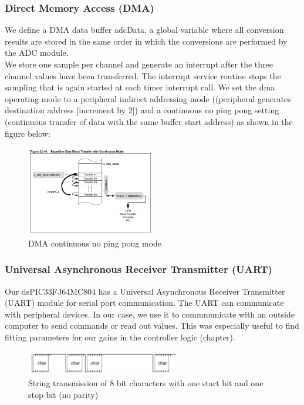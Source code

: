 \subsubsection*{Direct Memory Access (DMA)}

We define a DMA data buffer adcData, a global variable where all conversion results are stored in the same order in which the conversions are performed by the ADC module.\\
We store one sample per channel and generate an interrupt after the three channel values have been transferred. The interrupt service routine stops the sampling that is again started at each timer interrupt call.
\vskip 0.1in
\noindent
We set the dma operating mode to a peripheral indirect addressing mode ((peripheral generates destination address [increment by 2]) and a continuous no ping pong setting (continuous transfer of data with the same buffer start address) as shown in the figure below:

\begin{figure}[H]
    \centering
    \includegraphics[width=0.5\textwidth]{figures/software/DMA.png}
    \caption{DMA continuous no ping pong mode}
    \label{fig:dma}
\end{figure}

\subsubsection*{Universal Asynchronous Receiver Transmitter (UART)}
Our dsPIC33FJ64MC804 has a Universal Asynchronous Receiver Transmitter (UART)  module for serial port communication.
The UART can communicate with peripheral devices.
In our case, we use it to commmunicate with an outside computer to send commands or read out values. This was especially useful to find fitting parameters for our gains in the controller logic (chapter).

\begin{figure}[htb]
    \centering
    \includegraphics[width=0.6\textwidth]{figures/software/uart_demo.png}
    \caption {String transmission of 8 bit characters with one start bit and one stop bit (no parity) \cite{alex}}
    \label{fig:uart_demo}
\end{figure}

